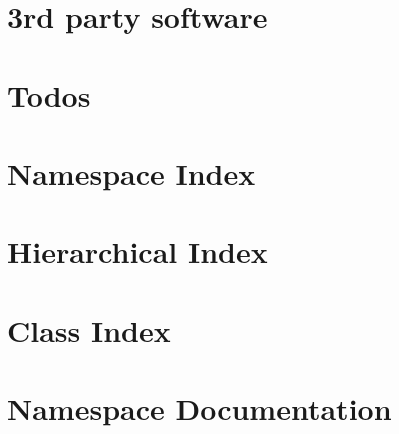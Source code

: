 \documentclass[twoside]{book}
\newcommand{\+}{\discretionary{\mbox{\scriptsize$\hookleftarrow$}}{}{}}
\begin{document}
\chapter{3rd party software}
\label{_3rdpartysoftware}

\chapter{Todos}
\label{todos}

\chapter{Namespace Index}

\chapter{Hierarchical Index}

\chapter{Class Index}

\chapter{Namespace Documentation}

\end{document}
